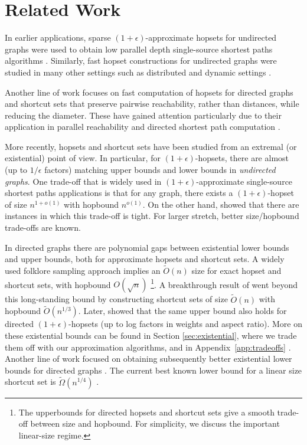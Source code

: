 \section{Related Work}
\label{sec:related_work}

In earlier applications, sparse $(1+\epsilon)$-approximate hopsets for undirected graphs were used to obtain low parallel depth single-source shortest paths algorithms \cite{klein1997, cohen2000, miller2015, elkin2019RNC}. Similarly, fast hopset constructions for undirected graphs were studied in many other settings such as distributed \cite{elkin2019journal, elkin2017, censor2021, elkin2017, dinitz2019, DM24} and dynamic settings \cite{bernstein2011,henzinger2014, gutenberg2020, chechik2018, LN2022}.

Another line of work focuses on fast computation of hopsets for directed graphs and shortcut sets that preserve pairwise reachability, rather than distances, while reducing the diameter. These have gained attention particularly due to their application in parallel reachability and directed shortest path computation \cite{ullman1990high, cao2020efficient, cao2020improved, cao2023exact, fineman2018nearly,jambulapati2019parallel}.

More recently, hopsets and shortcut sets have been studied from an extremal (or existential) point of view.
In particular, for $(1+\epsilon)$-hopsets, there are almost (up to $1/\epsilon$ factors) matching upper bounds \cite{elkin2019journal, huang2019} and lower bounds \cite{abboud2018} in \emph{undirected graphs}. One trade-off that is widely used in $(1+\epsilon)$-approximate single-source shortest paths applications is that for any graph, there exists a $(1+\epsilon)$-hopset of size $n^{1+o(1)}$ with hopbound $n^{o(1)}$.  On the other hand, \cite{abboud2018} showed that there are instances in which this trade-off is tight. For larger stretch, better size/hopbound trade-offs are known.

In directed graphs there are polynomial gaps between existential lower bounds and upper bounds, both for approximate hopsets and shortcut sets. A widely used folklore sampling approach implies an $\widetilde{O}(n)$ size for exact hopset and shortcut sets, with hopbound $O(\sqrt{n})$ \footnote{The upperbounds for directed hopsets and shortcut sets give a smooth trade-off between size and hopbound. For simplicity, we discuss the important linear-size regime.}.
A breakthrough result of \cite{KP22} went beyond this long-standing bound by constructing shortcut sets of size $\widetilde{O}(n)$ with hopbound $\widetilde{O}(n^{1/3})$. 
Later, \cite{BW23} showed that the same upper bound also holds for directed $(1+\epsilon)$-hopsets (up to log factors in weights and aspect ratio). More on these existential bounds can be found in Section \ref{sec:existential}, where we trade them off with our approximation algorithms\iflong \else, and in Appendix~\ref{app:tradeoffs} \fi. Another line of work focused on obtaining subsequently better existential lower bounds for directed graphs \cite{hesse2003directed, huang2021lower, kogan2023towards,  williams2024simpler}. The current best known lower bound for a linear size shortcut set is $\widetilde{\Omega}(n^{1/4})$ \cite{BH23folklore, williams2024simpler}. 

